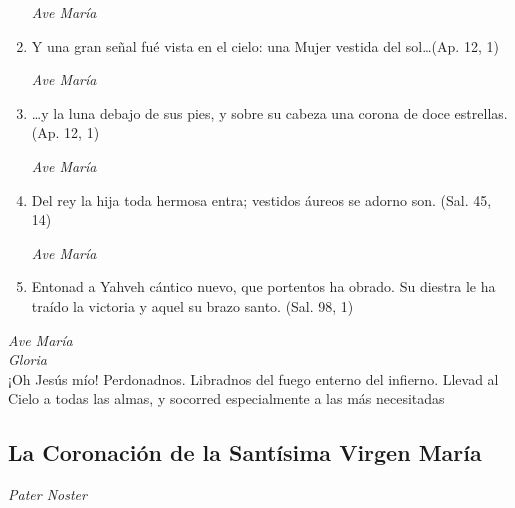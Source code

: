 \documentclass[a4paper,11pt, oneside]{report}
\begin{document}
\begin{enumerate}
        \textit{Ave María}

        \item Y una gran señal fué vista en el cielo: una Mujer vestida del sol\ldots (Ap. 12, 1)

        \textit{Ave María}

        \item {\ldots}y la luna debajo de sus pies, y sobre su cabeza una corona de doce estrellas. (Ap. 12, 1)

        \textit{Ave María}

        \item Del rey la hija toda hermosa entra; vestidos áureos se adorno son. (Sal. 45, 14)

        \textit{Ave María}

        \item Entonad a Yahveh cántico nuevo, que portentos ha obrado. Su diestra le ha traído la victoria y aquel su brazo santo. (Sal. 98, 1)

      \end{enumerate}

      \textit{Ave María} \\
      \indent\textit{Gloria} \\
      \indent¡Oh Jesús mío! Perdonadnos. Libradnos del fuego enterno del infierno. Llevad al Cielo a todas las almas, y socorred especialmente a las más 
      necesitadas

    \subsection*{La Coronación de la Santísima Virgen María }

      \textit{Pater Noster}
\end{document}
